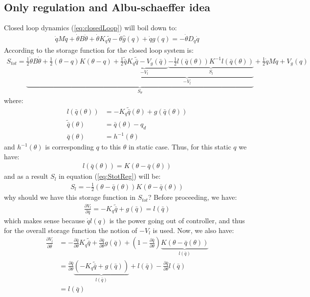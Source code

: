 \documentclass[11pt]{article}
\begin{document}
\subsection{Only regulation and Albu-schaeffer idea}
Closed loop dynamics (\ref{eq:closedLoop}) will boil down to: 
\begin{align}
\dot{q}M\ddot{q} + \dot{\theta}B\ddot{\theta} + \dot{\theta}K_q\tilde{q} - \dot{\theta}\hat{g}(q) + \dot{q}g(q) = -\dot{\theta}D_q\dot{q}
\end{align}
According to \cite{albu2004passivity} the storage function for the closed loop system is: 
\begin{align}
S_{tot} = \underbrace{\frac{1}{2}\dot{\theta}B\dot{\theta} + \frac{1}{2}(\theta-q)K(\theta-q) + \underbrace{\underbrace{\frac{1}{2}\tilde{\bar{q}}K_q\tilde{\bar{q}} - V_g(\bar{q})}_{-V_l}  \underbrace{-\frac{1}{2}l(\bar{q}(\theta))K^{-1}l(\bar{q}(\theta))}_{S_l}}_{-V_{\bar{l}}}}_{S_\theta} + \frac{1}{2}\dot{q}M\dot{q} + V_g(q) \label{eq:StotReg}
\end{align}
where: 
\begin{align}
l(\bar{q}(\theta)) &= -K_q\tilde{\bar{q}}(\theta) + g(\bar{q}(\theta)) \\
\tilde{\bar{q}}(\theta) &= \bar{q}(\theta) - q_d \\
\bar{q}(\theta) &= h^{-1}(\theta)
\end{align}
and $h^{-1}(\theta)$ is corresponding $q$ to this $\theta$ in static case. Thus, for this static $q$ we have: 
\begin{align}
l(\bar{q}(\theta)) = K(\theta-\bar{q}(\theta))
\end{align}
and as a result $S_l$ in equation (\ref{eq:StotReg}) will be: 
\begin{align}
S_l = -\frac{1}{2}(\theta-\bar{q}(\theta))K(\theta-\bar{q}(\theta))
\end{align}
why should we have this storage function in $S_{tot}$? 
Before proceeding, we have: 
\begin{align}
\frac{\partial V_l}{\partial \bar{q}} = -K_q\tilde{\bar{q}} + g(\bar{q}) = l(\bar{q})
\end{align}
which makes sense because $\dot{q}l(q)$ is the power going out of controller, and thus for the overall storage function the notion of $-V_l$ is used. 
Now, we also have: 
\begin{align}
\frac{\partial V_{\bar{l}}}{\partial \bar{\theta}} &= -\frac{\partial \bar{q}}{\partial \theta}K_q\tilde{\bar{q}} + \frac{\partial \bar{q}}{\partial \theta}g(\bar{q}) + (1-\frac{\partial \bar{q}}{\partial \theta})\underbrace{K(\theta-\bar{q}(\theta))}_{l(\bar{q})} \nonumber \\
&= \frac{\partial \bar{q}}{\partial \theta}\underbrace{(-K_q\tilde{\bar{q}}+g(\bar{q}))}_{l(\bar{q})} + l(\bar{q}) -  \frac{\partial \bar{q}}{\partial \theta}l(\bar{q}) \nonumber \\
&= l(\bar{q})
\end{align}

{}
%
\end{document}
